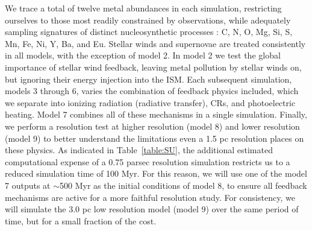 \documentclass[11pt]{article}
\begin{document}
We trace a total of twelve metal abundances in each simulation, restricting ourselves to those most readily constrained by observations, while adequately sampling signatures of distinct nucleosynthetic processes \citep[see][and references therein]{Tolstoy2009}: C, N, O, Mg, Si, S, Mn, Fe, Ni, Y, Ba, and Eu. Stellar winds and supernovae are treated consistently in all models, with the exception of model 2. In model 2 we test the global importance of stellar wind feedback, leaving metal pollution by stellar winds on, but ignoring their energy injection into the ISM. Each subsequent simulation, models 3 through 6, varies the combination of feedback physics included, which we separate into ionizing radiation (radiative transfer), CRs, and photoelectric heating. Model 7 combines all of these mechanisms in a single simulation. Finally, we perform a resolution test at higher resolution (model 8) and lower resolution (model 9) to better understand the limitations even a 1.5 pc resolution places on these physics. As indicated in Table~\ref{table:SU}, the additional estimated computational expense of a 0.75 parsec resolution simulation restricts us to a reduced simulation time of 100 Myr. For this reason, we will use one of the model 7 outputs at $\sim$500 Myr as the initial conditions of model 8, to ensure all feedback mechanisms are active for a more faithful resolution study. For consistency, we will simulate the 3.0 pc low resolution model (model 9) over the same period of time, but for a small fraction of the cost.
\end{document}

